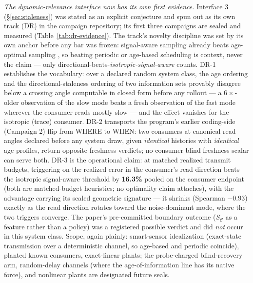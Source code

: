 \documentclass{article}
\theoremstyle{definition}
\theoremstyle{remark}
\newcommand{\SC}{S_{\mathcal{C}}}
\begin{document}
\emph{The dynamic-relevance interface now has its own first evidence.}
Interface 3 (\S\ref{sec:staleness}) was stated as an explicit conjecture
and spun out as its own track (DR) in the campaign repository; its first
three campaigns are sealed and measured
(Table~\ref{tab:dr-evidence}). The track's novelty discipline was set by
its own anchor before any bar was frozen: signal-aware sampling already
beats age-optimal sampling \citep{sun2020}, so beating periodic or
age-based scheduling is context, never the claim --- only
directional-beats-\emph{isotropic-signal-aware} counts. DR-1
establishes the vocabulary: over a declared random system class, the
age ordering and the directional-staleness ordering of two information
sets provably disagree below a crossing angle computable in closed form
before any rollout --- a $6\times$-older observation of the slow mode
beats a fresh observation of the fast mode wherever the consumer reads
mostly slow --- and the effect vanishes for the isotropic (trace)
consumer. DR-2 transports the program's earlier coding-side (Campaign-2) flip from WHERE to
WHEN: two consumers at canonical read angles declared before any system
draw, given \emph{identical} histories with \emph{identical} age
profiles, return opposite freshness verdicts; no consumer-blind
freshness scalar can serve both. DR-3 is the operational claim: at
matched realized transmit budgets, triggering on the realized error in
the consumer's read direction beats the isotropic signal-aware
threshold by \textbf{16.3\%} pooled on the consumer endpoint (both are
matched-budget heuristics; no optimality claim attaches), with the
advantage carrying its sealed geometric signature --- it shrinks
(Spearman $-0.93$) exactly as the read direction rotates toward the
noise-dominant mode, where the two triggers converge. The paper's
pre-committed boundary outcome ($\SC$ as a feature rather than a
policy) was a registered possible verdict and did \emph{not} occur in
this system class. Scope, again plainly: smart-sensor idealization
(exact-state transmission over a deterministic channel, so age-based
and periodic coincide), planted known consumers, exact-linear plants;
the probe-charged blind-recovery arm, random-delay channels (where the
age-of-information line has its native force), and nonlinear plants are
designated future seals.
\end{document}
